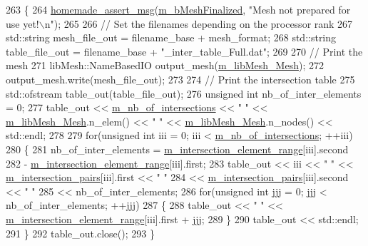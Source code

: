 \begin{DoxyCode}
263 \{
264     \hyperlink{common__header_8h_a593ccc80b790b2268653fcf6597bf451}{homemade\_assert\_msg}(\hyperlink{classcarl_1_1_mesh___intersection_ae858bc08b5286b0562eaf94372944bcd}{m\_bMeshFinalized}, \textcolor{stringliteral}{"Mesh not prepared for use
       yet!\(\backslash\)n"});
265 
266     \textcolor{comment}{// Set the filenames depending on the processor rank}
267     std::string mesh\_file\_out = filename\_base + mesh\_format;
268     std::string table\_file\_out = filename\_base + \textcolor{stringliteral}{"\_inter\_table\_Full.dat"};
269 
270     \textcolor{comment}{// Print the mesh}
271     libMesh::NameBasedIO output\_mesh(\hyperlink{classcarl_1_1_mesh___intersection_aeea7835637a936ca4f272e48cea18fa2}{m\_libMesh\_Mesh});
272     output\_mesh.write(mesh\_file\_out);
273 
274     \textcolor{comment}{// Print the intersection table}
275     std::ofstream table\_out(table\_file\_out);
276     \textcolor{keywordtype}{unsigned} \textcolor{keywordtype}{int} nb\_of\_inter\_elements = 0;
277     table\_out << \hyperlink{classcarl_1_1_mesh___intersection_a60ae2905b3c3debe5194811e176826ce}{m\_nb\_of\_intersections} << \textcolor{stringliteral}{" "} << 
      \hyperlink{classcarl_1_1_mesh___intersection_aeea7835637a936ca4f272e48cea18fa2}{m\_libMesh\_Mesh}.n\_elem() << \textcolor{stringliteral}{" "} << \hyperlink{classcarl_1_1_mesh___intersection_aeea7835637a936ca4f272e48cea18fa2}{m\_libMesh\_Mesh}.n\_nodes() << std::endl;
278 
279     \textcolor{keywordflow}{for}(\textcolor{keywordtype}{unsigned} \textcolor{keywordtype}{int} iii = 0; iii < \hyperlink{classcarl_1_1_mesh___intersection_a60ae2905b3c3debe5194811e176826ce}{m\_nb\_of\_intersections}; ++iii)
280     \{
281         nb\_of\_inter\_elements = \hyperlink{classcarl_1_1_mesh___intersection_adcbc0fb898aa287c2ff2a13693daf572}{m\_intersection\_element\_range}[iii].second
282                              - \hyperlink{classcarl_1_1_mesh___intersection_adcbc0fb898aa287c2ff2a13693daf572}{m\_intersection\_element\_range}[iii].first;
283         table\_out << iii << \textcolor{stringliteral}{" "} << \hyperlink{classcarl_1_1_mesh___intersection_a06a4d0d633bf58594fee6e35ebbc1b97}{m\_intersection\_pairs}[iii].first << \textcolor{stringliteral}{" "}
284                                 << \hyperlink{classcarl_1_1_mesh___intersection_a06a4d0d633bf58594fee6e35ebbc1b97}{m\_intersection\_pairs}[iii].second << \textcolor{stringliteral}{" "}
285                                 << nb\_of\_inter\_elements;
286         \textcolor{keywordflow}{for}(\textcolor{keywordtype}{unsigned} \textcolor{keywordtype}{int} jjj = 0; jjj < nb\_of\_inter\_elements; ++jjj)
287         \{
288             table\_out << \textcolor{stringliteral}{" "} << \hyperlink{classcarl_1_1_mesh___intersection_adcbc0fb898aa287c2ff2a13693daf572}{m\_intersection\_element\_range}[iii].first + jjj;
289         \}
290         table\_out << std::endl;
291     \}
292     table\_out.close();
293 \}
\end{DoxyCode}
